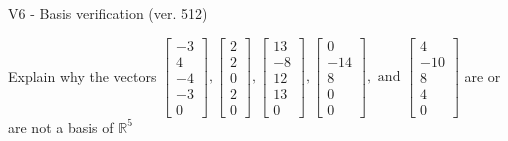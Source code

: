 \begin{exercise}
  \begin{exerciseTitle}V6 - Basis verification (ver. 512)\end{exerciseTitle}
  \begin{exerciseStatement}
    Explain why the vectors \(\left[\begin{array}{r}
-3 \\
4 \\
-4 \\
-3 \\
0
\end{array}\right] , \left[\begin{array}{r}
2 \\
2 \\
0 \\
2 \\
0
\end{array}\right] , \left[\begin{array}{r}
13 \\
-8 \\
12 \\
13 \\
0
\end{array}\right] , \left[\begin{array}{r}
0 \\
-14 \\
8 \\
0 \\
0
\end{array}\right] , \text{ and } \left[\begin{array}{r}
4 \\
-10 \\
8 \\
4 \\
0
\end{array}\right]\) are or are not a basis of \(\mathbb{R}^5\)	



\end{exerciseStatement}
\end{exercise}
